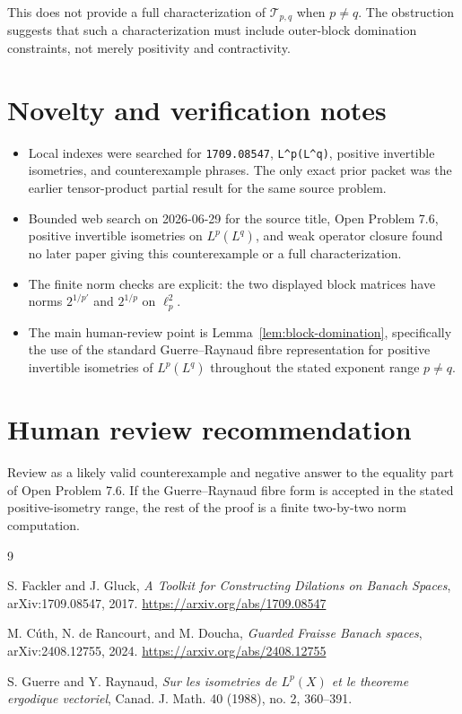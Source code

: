 \documentclass[11pt]{amsart}
\theoremstyle{remark}
\newcommand{\calT}{\mathcal T}
\begin{document}
This does not provide a full characterization of $\calT_{p,q}$ when $p\ne q$.
The obstruction suggests that such a characterization must include
outer-block domination constraints, not merely positivity and contractivity.

\section*{Novelty and verification notes}

\begin{itemize}[leftmargin=*]
\item Local indexes were searched for \texttt{1709.08547},
\texttt{L\^{}p(L\^{}q)}, positive invertible isometries, and counterexample
phrases.  The only exact prior packet was the earlier tensor-product partial
result for the same source problem.
\item Bounded web search on 2026-06-29 for the source title, Open Problem 7.6,
positive invertible isometries on $L^p(L^q)$, and weak operator closure found
no later paper giving this counterexample or a full characterization.
\item The finite norm checks are explicit: the two displayed block matrices
have norms $2^{1/p'}$ and $2^{1/p}$ on $\ell_p^2$.
\item The main human-review point is Lemma~\ref{lem:block-domination},
specifically the use of the standard Guerre--Raynaud fibre representation for
positive invertible isometries of $L^p(L^q)$ throughout the stated exponent
range $p\ne q$.
\end{itemize}

\section*{Human review recommendation}

Review as a likely valid counterexample and negative answer to the equality
part of Open Problem 7.6.  If the Guerre--Raynaud fibre form is accepted in
the stated positive-isometry range, the rest of the proof is a finite
two-by-two norm computation.

\begin{thebibliography}{9}

S. Fackler and J. Gluck,
\emph{A Toolkit for Constructing Dilations on Banach Spaces},
arXiv:1709.08547, 2017.
\url{https://arxiv.org/abs/1709.08547}

M. C\'uth, N. de Rancourt, and M. Doucha,
\emph{Guarded Fraisse Banach spaces},
arXiv:2408.12755, 2024.
\url{https://arxiv.org/abs/2408.12755}

S. Guerre and Y. Raynaud,
\emph{Sur les isometries de \(L^p(X)\) et le theoreme ergodique vectoriel},
Canad. J. Math. 40 (1988), no. 2, 360--391.

\end{thebibliography}
\end{document}
